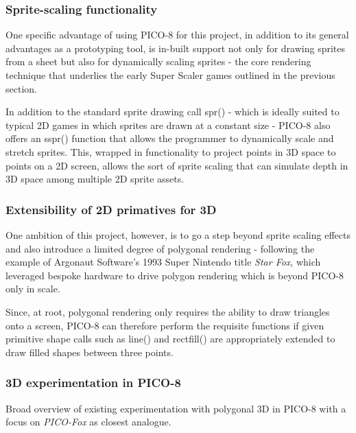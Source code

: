 \documentclass{article}
\begin{document}
\subsubsection*{Sprite-scaling functionality}
One specific advantage of using PICO-8 for this project, in addition to its general
advantages as a prototyping tool, is in-built support not only for drawing sprites
from a sheet but also for dynamically scaling sprites - the core rendering technique
that underlies the early Super Scaler games outlined in the previous section.

In addition to the standard sprite drawing call spr() - which is ideally suited to
typical 2D games in which sprites are drawn at a constant size - PICO-8 also offers
an sspr() function that allows the programmer to dynamically scale and stretch sprites.
This, wrapped in functionality to project points in 3D space to points on a 2D screen,
allows the sort of sprite scaling that can simulate depth in 3D space among
multiple 2D sprite assets.

\subsubsection*{Extensibility of 2D primatives for 3D}
One ambition of this project, however, is to go a step beyond sprite scaling effects
and also introduce a limited degree of polygonal rendering - following the example of
Argonaut Software's 1993 Super Nintendo title \textit{Star Fox}, which leveraged bespoke
hardware to drive polygon rendering which is beyond PICO-8 only in scale.

Since, at root, polygonal rendering only requires the ability to draw triangles onto a
screen, PICO-8 can therefore perform the requisite functions if given primitive shape calls such
as line() and rectfill() are appropriately extended to draw filled shapes between three points.

\subsubsection*{3D experimentation in PICO-8}
Broad overview of existing experimentation with polygonal 3D in PICO-8 with a
focus on \textit{PICO-Fox} as closest analogue. 
\end{document}

